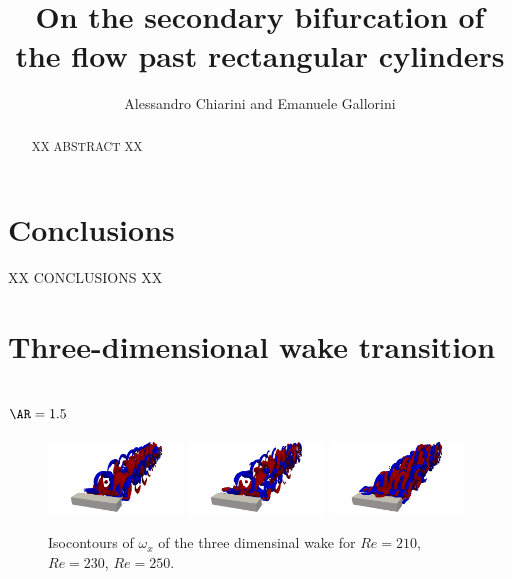 \documentclass{jfm}
\begin{document}
\title{On the secondary bifurcation of the flow past rectangular cylinders}
\author{Alessandro Chiarini and Emanuele Gallorini}
\maketitle

\begin{abstract}
XX ABSTRACT XX
\end{abstract}

\begin{keywords}
\end{keywords}










  

\section{Conclusions}
XX CONCLUSIONS XX  

\section{Three-dimensional wake transition }

\subsection{$\AR=1.5$}

\begin{figure}
  \centering
  \includegraphics[trim={12cm 0 12cm 0},clip,width=0.32\textwidth]{./fig/Wake/AR1.5Re210.png}   
  \includegraphics[trim={12cm 0 12cm 0},clip,width=0.32\textwidth]{./fig/Wake/AR1.5Re230.png} 
  \includegraphics[trim={12cm 0 12cm 0},clip,width=0.32\textwidth]{./fig/Wake/AR1.5Re250.png}
  \caption{Isocontours of $\omega_x$ of the three dimensinal wake for $Re=210$, $Re=230$, $Re=250$.}
  \label{fig:wake1.5}
\end{figure}  
\end{document}
